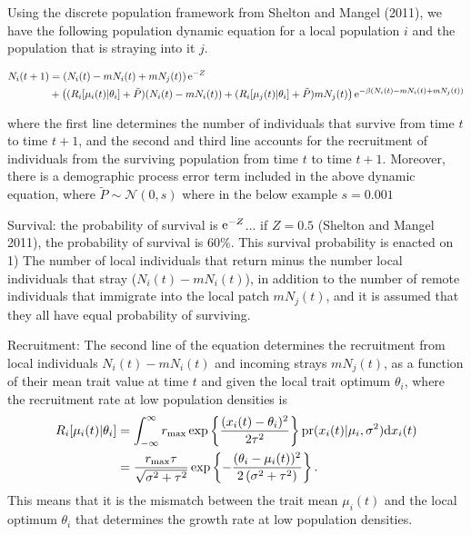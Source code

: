 \documentclass[onecolumn,preprintnumbers,amsmath,amssymb,superscriptaddress]{revtex4}
\begin{document}
Using the discrete population framework from Shelton and Mangel (2011), we have the following population dynamic equation for a local population $i$ and the population that is straying into it $j$.

\begin{align}
  N_i(t+1) &= \left(N_i(t) - m N_i(t) + m N_j(t) \right){\rm e}^{-Z} \\ \nonumber
  &+ \left((R_i[\mu_i(t)|\theta_i]+\tilde{P}) (N_i(t) - m N_i(t))+ (R_i[\mu_j(t)|\theta_i]+\tilde{P}) m N_j(t)\right) {\rm e}^{-\beta (N_i(t) - m N_i(t)+ m N_j(t))}
\end{align}

\noindent where the first line determines the number of individuals that survive from time $t$ to time $t+1$, and the second and third line accounts for the recruitment of individuals from the surviving population from time $t$ to time $t+1$.
Moreover, there is a demographic process error term included in the above dynamic equation, where $\tilde{P}\sim \mathcal{N}(0,s)$ where in the below example $s=0.001$

Survival: the probability of survival is ${\rm e}^{-Z}$... if $Z=0.5$ (Shelton and Mangel 2011), the probability of survival is 60\%. 
This survival probability is enacted on 1) The number of local individuals that return minus the number local individuals that stray ($N_i(t) - mN_i(t)$), in addition to the number of remote individuals that immigrate into the local patch $mN_j(t)$, and it is assumed that they all have equal probability of surviving.

Recruitment: The second line of the equation determines the recruitment from local individuals $N_i(t)-mN_i(t)$ and incoming strays $mN_j(t)$, as a function of their mean trait value at time $t$ and given the local trait optimum $\theta_i$, where the recruitment rate at low population densities is
\begin{align}
  R_i[\mu_i(t)|\theta_i] &= \int_{-\infty}^\infty r_{\rm max}\exp\left\{\frac{(x_i(t)-\theta_i)^2}{2\tau^2}\right\} {\rm pr}(x_i(t)|\mu_i,\sigma^2) {\rm d}x_i(t) \\ \nonumber
  &= \frac{r_{\rm max} \tau  }{\sqrt{\sigma ^2+\tau ^2}}\exp\left\{-\frac{(\theta_i-\mu_i(t))^2}{2 \left(\sigma ^2+\tau ^2\right)}\right\}.
\end{align}
This means that it is the mismatch between the trait mean $\mu_i(t)$ and the local optimum $\theta_i$ that determines the  growth rate at low population densities.
\end{document}

